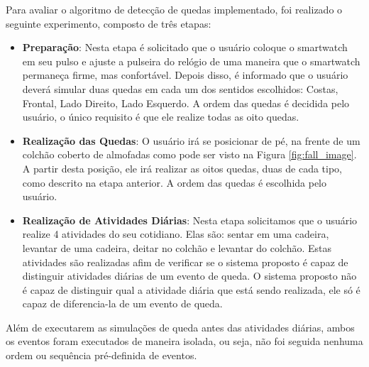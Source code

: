 Para avaliar o algoritmo de detecção de quedas implementado, foi realizado o seguinte experimento, composto de três etapas:

\begin{itemize}
	\item{\textbf{Preparação}: Nesta etapa é solicitado que o usuário coloque o smartwatch em seu pulso e ajuste a pulseira do relógio de uma maneira que o smartwatch permaneça firme, mas confortável. Depois disso, é informado que o usuário deverá simular duas quedas em cada um dos sentidos escolhidos: Costas, Frontal, Lado Direito, Lado Esquerdo. A ordem das quedas é decidida pelo usuário, o único requisito é que ele realize todas as oito quedas. }
	
	\item{\textbf{Realização das Quedas}: O usuário irá se posicionar de pé, na frente de um colchão coberto de almofadas como pode ser visto na Figura \ref{fig:fall_image}. A partir desta posição, ele irá realizar as oitos quedas, duas de cada tipo, como descrito na etapa anterior. A ordem das quedas é escolhida pelo usuário.  }
	
	\item{\textbf{Realização de Atividades Diárias}: Nesta etapa solicitamos que o usuário realize 4 atividades do seu cotidiano. Elas são: sentar em uma cadeira, levantar de uma cadeira, deitar no colchão e levantar do colchão. Estas atividades são realizadas afim de verificar se o sistema proposto é capaz de distinguir atividades diárias de um evento de queda. O sistema proposto não é capaz de distinguir qual a atividade diária que está sendo realizada, ele só é capaz de diferencia-la de um evento de queda.}
	
	
\end{itemize}


Além de executarem as simulações de queda antes das atividades diárias, ambos os eventos foram executados de maneira isolada, ou seja, não foi seguida nenhuma ordem ou sequência pré-definida de eventos. 

